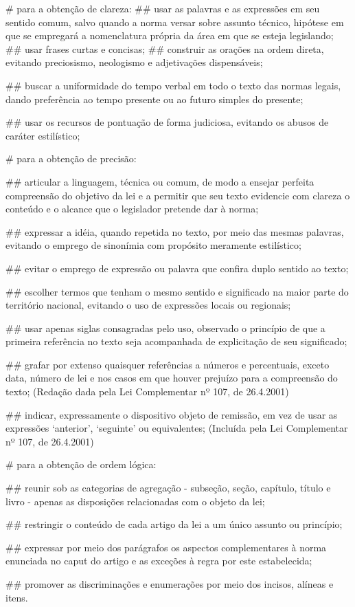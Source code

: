 \documentclass[a5paper,capitulo,titlepage=false]{br-lex}
\begin{document}
\begin{easylist}
	# para a obtenção de clareza:
	## usar as palavras e as expressões em seu sentido comum, salvo quando a norma versar sobre assunto técnico, hipótese em que se empregará a nomenclatura própria da área em que se esteja legislando;
	##  usar frases curtas e concisas;
	## construir as orações na ordem direta, evitando preciosismo, neologismo e adjetivações dispensáveis;
	
	## buscar a uniformidade do tempo verbal em todo o texto das normas legais, dando preferência ao tempo presente ou ao futuro simples do presente;
	
	## usar os recursos de pontuação de forma judiciosa, evitando os abusos de caráter estilístico;
	
	# para a obtenção de precisão:
	
	## articular a linguagem, técnica ou comum, de modo a ensejar perfeita compreensão do objetivo da lei e a permitir que seu texto evidencie com clareza o conteúdo e o alcance que o legislador pretende dar à norma;
	
	## expressar a idéia, quando repetida no texto, por meio das mesmas palavras, evitando o emprego de sinonímia com propósito meramente estilístico;
	
	## evitar o emprego de expressão ou palavra que confira duplo sentido ao texto;
	
	## escolher termos que tenham o mesmo sentido e significado na maior parte do território nacional, evitando o uso de expressões locais ou regionais;
	
	## usar apenas siglas consagradas pelo uso, observado o princípio de que a primeira referência no texto seja acompanhada de explicitação de seu significado;
	
	
	## grafar por extenso quaisquer referências a números e percentuais, exceto data, número de lei e nos casos em que houver prejuízo para a compreensão do texto;     (Redação dada pela Lei Complementar nº 107, de 26.4.2001)
	
	## indicar, expressamente o dispositivo objeto de remissão, em vez de usar as expressões ‘anterior’, ‘seguinte’ ou equivalentes;     (Incluída pela Lei Complementar nº 107, de 26.4.2001)
	
	# para a obtenção de ordem lógica:
	
## reunir sob as categorias de agregação - subseção, seção, capítulo, título e livro - apenas as disposições relacionadas com o objeto da lei;
	
	## restringir o conteúdo de cada artigo da lei a um único assunto ou princípio;
	
	## expressar por meio dos parágrafos os aspectos complementares à norma enunciada no caput do artigo e as exceções à regra por este estabelecida;
	
	## promover as discriminações e enumerações por meio dos incisos, alíneas e itens.
	\end{easylist}
\end{document}
